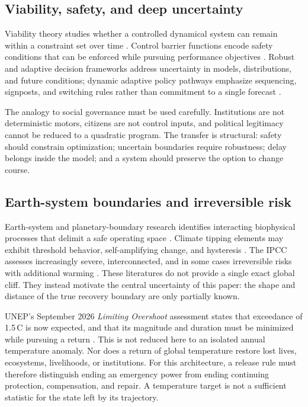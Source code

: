 \documentclass[11pt,a4paper]{article}
\numberwithin{equation}{section}
\theoremstyle{definition}
\theoremstyle{plain}
\theoremstyle{remark}
\begin{document}
\subsection{Viability, safety, and deep uncertainty}

Viability theory studies whether a controlled dynamical system can remain within a constraint set over time \citep{aubin2011}. Control barrier functions encode safety conditions that can be enforced while pursuing performance objectives \citep{ames2017,ames2019}. Robust and adaptive decision frameworks address uncertainty in models, distributions, and future conditions; dynamic adaptive policy pathways emphasize sequencing, signposts, and switching rules rather than commitment to a single forecast \citep{haasnoot2013,kwakkel2016}.

The analogy to social governance must be used carefully. Institutions are not deterministic motors, citizens are not control inputs, and political legitimacy cannot be reduced to a quadratic program. The transfer is structural: safety should constrain optimization; uncertain boundaries require robustness; delay belongs inside the model; and a system should preserve the option to change course.

\subsection{Earth-system boundaries and irreversible risk}

Earth-system and planetary-boundary research identifies interacting biophysical processes that delimit a safe operating space \citep{rockstrom2023,richardson2023}. Climate tipping elements may exhibit threshold behavior, self-amplifying change, and hysteresis \citep{scheffer2009,armstrong2022}. The IPCC assesses increasingly severe, interconnected, and in some cases irreversible risks with additional warming \citep{ipcc2022,ipcc2023}. These literatures do not provide a single exact global cliff. They instead motivate the central uncertainty of this paper: the shape and distance of the true recovery boundary are only partially known.

UNEP's September 2026 \emph{Limiting Overshoot} assessment states that exceedance of 1.5\,\textdegree C is now expected, and that its magnitude and duration must be minimized while pursuing a return \citep{unep2026overshoot}. This is not reduced here to an isolated annual temperature anomaly. Nor does a return of global temperature restore lost lives, ecosystems, livelihoods, or institutions. For this architecture, a release rule must therefore distinguish ending an emergency power from ending continuing protection, compensation, and repair. A temperature target is not a sufficient statistic for the state left by its trajectory.
\end{document}
